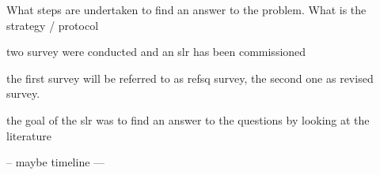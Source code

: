 What steps are undertaken to find an answer to the problem. What is the strategy / protocol	


two survey were conducted and an slr has been commissioned

the first survey will be referred to as refsq survey, the second one as revised survey. 


the goal of the slr was to find an answer to the questions by looking at the literature 



--
maybe timeline 
---